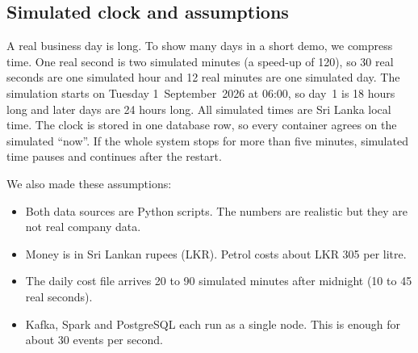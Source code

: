 \subsection{Simulated clock and assumptions}
A real business day is long. To show many days in a short demo, we compress time. One real second is two
simulated minutes (a speed-up of 120), so 30 real seconds are one simulated hour and 12 real minutes are one
simulated day. The simulation starts on Tuesday 1~September~2026 at 06:00, so day~1 is 18 hours long and
later days are 24 hours long. All simulated times are Sri Lanka local time. The clock is stored in one
database row, so every container agrees on the simulated ``now''. If the whole system stops for more than
five minutes, simulated time pauses and continues after the restart.

We also made these assumptions:
\begin{itemize}
\item Both data sources are Python scripts. The numbers are realistic but they are not real company data.
\item Money is in Sri Lankan rupees (LKR). Petrol costs about LKR 305 per litre.
\item The daily cost file arrives 20 to 90 simulated minutes after midnight (10 to 45 real seconds).
\item Kafka, Spark and PostgreSQL each run as a single node. This is enough for about 30 events per second.
\end{itemize}

